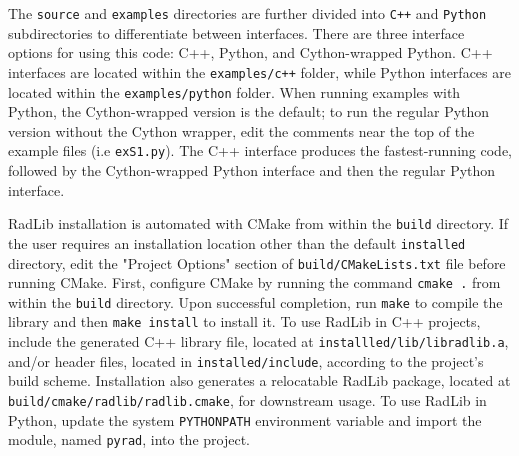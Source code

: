 \documentclass[preprint,12pt]{elsarticle}
\begin{document}
The \texttt{source} and \texttt{examples} directories are further divided into \texttt{C++} and \texttt{Python} subdirectories to differentiate between interfaces. There are three interface options for using this code: C++, Python, and Cython-wrapped Python. C++ interfaces are located within the \texttt{examples/c++} folder, while Python interfaces are located within the \texttt{examples/python} folder. When running examples with Python, the Cython-wrapped version is the default; to run the regular Python version without the Cython wrapper, edit the comments near the top of the example files (i.e \texttt{ex\textunderscore S1.py}). The C++ interface produces the fastest-running code, followed by the Cython-wrapped Python interface and then the regular Python interface.

RadLib installation is automated with CMake from within the \texttt{build} directory. If the user requires an installation location other than the default \texttt{installed} directory, edit the "Project Options" section of \texttt{build/CMakeLists.txt} file before running CMake. First, configure CMake by running the command \texttt{cmake .} from within the \texttt{build} directory. Upon successful completion, run \texttt{make} to compile the library and then \texttt{make install} to install it. To use RadLib in C++ projects, include the generated C++ library file, located at \texttt{installled/lib/libradlib.a}, and/or header files, located in \texttt{installed/include}, according to the project's build scheme. Installation also generates a relocatable RadLib package, located at \texttt{build/cmake/radlib/radlib.cmake}, for downstream usage. To use RadLib in Python, update the system \texttt{PYTHONPATH} environment variable and import the module, named \texttt{pyrad}, into the project. 
\end{document}
